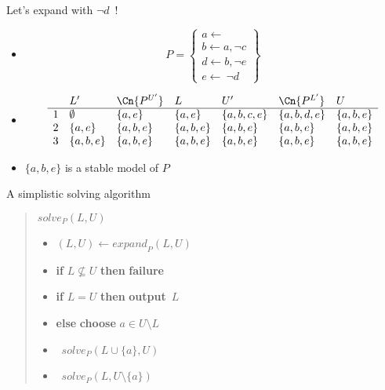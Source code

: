 \begin{frame}{Let's expand with $\neg d$~!}
\begin{itemize}
\item<1-> []
\[
P
=
\left\{
  \begin{array}{l}
    a\leftarrow\\  b\leftarrow a,\neg c\\ d\leftarrow b,\neg e\\ e\leftarrow~\neg d
  \end{array}
\right\}
\]
\item<2-> []
\[
\begin{array}{cllllll}
  & L'        & \Cn{P^{U'}} & L         & U'           & \Cn{P^{L'}} & U        \\
\hline
1 & \emptyset & \{a,e\}       & \{a,e\}   & \{a,b,c,e\}  & \{a,b,d,e\} & \{a,b,e\}\\
2 & \{a,e\}   & \{a,b,e\}     & \{a,b,e\} & \{a,b,e\}    & \{a,b,e\}   & \{a,b,e\}\\
3 & \{a,b,e\} & \{a,b,e\}     & \{a,b,e\} & \{a,b,e\}    & \{a,b,e\} & \{a,b,e\}\\
\end{array}
\]
\medskip
\medskip
\item<3->  $\{a,b,e\}$ is a stable model of $P$
\end{itemize}
\end{frame}
\begin{frame}{A simplistic solving algorithm}
\bigskip
\begin{quote}
$\mathit{solve}_P(L,U)$
\medskip
\begin{itemize}\normalsize
\item [] $(L,U)\leftarrow\mathit{expand}_P(L,U)$\hfill{}
\item [] \textbf{if} $L\not\subseteq U$ \textbf{then} \textbf{failure}\hfill{}
\item [] \textbf{if} $L=U$              \textbf{then} \textbf{output}~$L$\hfill{}
\item [] \textbf{else} \textbf{choose} $a\in U\setminus L$\hfill{}
\item [] \qquad\ $\mathit{solve}_P(L\cup\{a\},U              )$
\item [] \qquad\ $\mathit{solve}_P(L,         U\setminus\{a\})$
\end{itemize}
\end{quote}
\end{frame}
